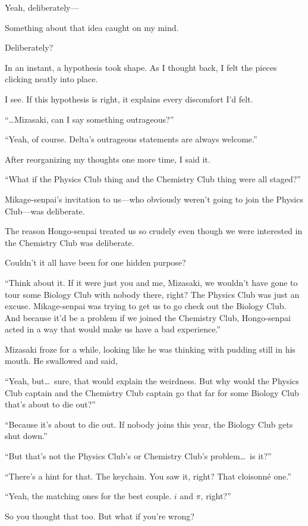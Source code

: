 \documentclass[
    a4paper,
    12pt,
    twoside,
    openany,
    UTF8,
    fontset=windows
]{ctexbook}
\begin{document}
Yeah, deliberately---

Something about that idea caught on my mind.

Deliberately?

In an instant, a hypothesis took shape. As I thought back, I felt the pieces clicking neatly into place.

I see. If this hypothesis is right, it explains every discomfort I'd felt.

``\dots Mizasaki, can I say something outrageous?''

``Yeah, of course. Delta's outrageous statements are always welcome.''

After reorganizing my thoughts one more time, I said it.

``What if the Physics Club thing and the Chemistry Club thing were all staged?''

Mikage-senpai's invitation to us---who obviously weren't going to join the Physics Club---was deliberate.

The reason Hongo-senpai treated us so crudely even though we were interested in the Chemistry Club was deliberate.

Couldn't it all have been for one hidden purpose?

``Think about it. If it were just you and me, Mizasaki, we wouldn't have gone to tour some Biology Club with nobody there, right? The Physics Club was just an excuse. Mikage-senpai was trying to get us to go check out the Biology Club. And because it'd be a problem if we joined the Chemistry Club, Hongo-senpai acted in a way that would make us have a bad experience.''

Mizasaki froze for a while, looking like he was thinking with pudding still in his mouth. He swallowed and said,

``Yeah, but\dots\ sure, that would explain the weirdness. But why would the Physics Club captain and the Chemistry Club captain go that far for some Biology Club that's about to die out?''

``Because it's about to die out. If nobody joins this year, the Biology Club gets shut down.''

``But that's not the Physics Club's or Chemistry Club's problem\dots\ is it?''

``There's a hint for that. The keychain. You saw it, right? That cloisonné one.''

``Yeah, the matching ones for the best couple. $i$ and $\pi$, right?''

So you thought that too. But what if you're wrong?
\end{document}
